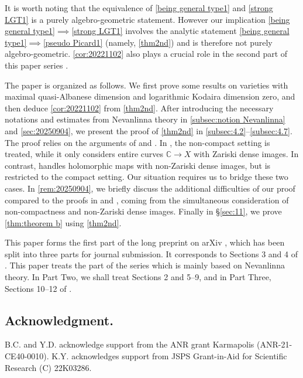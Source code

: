 \documentclass[11pt,english]{smfart}
\theoremstyle{plain}
\theoremstyle{definition}
\theoremstyle{remark}
\numberwithin{equation}{section}
\theoremstyle{plain}
\newcommand{\bC}{\mathbb{C}}
\begin{document}
	


	
	
	It is worth noting that the equivalence of \ref{being general type1} and \ref{strong LGT1} is a purely algebro-geometric statement.
	However our implication \ref{being general type1}$\implies$\ref{strong LGT1} involves the analytic statement \ref{being general type1}$\implies$\ref{pseudo Picard1} (namely, \cref{thm2nd}) and is therefore not purely algebro-geometric.
	\cref{cor:20221102} also plays a crucial role in the second part of this paper series \cite{CDY22}. 
	
	
	
	
	\medspace
	
The paper is organized as follows. We first prove some results on varieties with maximal quasi-Albanese dimension and logarithmic Kodaira dimension zero, and then deduce \cref{cor:20221102} from \cref{thm2nd}. After introducing the necessary notations and estimates from Nevanlinna theory in \cref{subsec:notion Nevanlinna} and \cref{sec:20250904}, we present the proof of \cref{thm2nd} in \cref{subsec:4.2}–\cref{subsec:4.7}. 
The proof relies on the arguments of \cite{NWY13} and \cite{Yam15}.
In \cite{NWY13}, the non-compact setting is treated, while it only considers entire curves $\bC\to X$ with Zariski dense images. In contrast, \cite{Yam15} handles holomorphic maps with non-Zariski dense images, but is restricted to the compact setting.
Our situation requires us to bridge these two cases.
In \cref{rem:20250904}, we briefly discuss the additional difficulties of our proof compared to the proofs in \cite{NWY13} and \cite{Yam15}, coming from the simultaneous consideration of non-compactness and non-Zariski dense images.
Finally in \S \ref{sec:11}, we prove \cref{thm:theorem b} using \cref{thm2nd}.


This paper forms the first part of the long preprint on arXiv \cite{CDY22original}, which has been split into three parts for journal submission.  
It corresponds to Sections 3 and 4 of \cite{CDY22original}.
This paper treats the part of the series which is mainly based on Nevanlinna theory.
 In Part Two, we shall treat Sections 2 and 5–9, and in Part Three, Sections 10–12 of \cite{CDY22original}.



\subsection*{Acknowledgment.}  
B.C. and Y.D. acknowledge support from the ANR grant Karmapolis (ANR-21-CE40-0010).  
K.Y. acknowledges support from JSPS Grant-in-Aid for Scientific Research (C) 22K03286.
\end{document}
